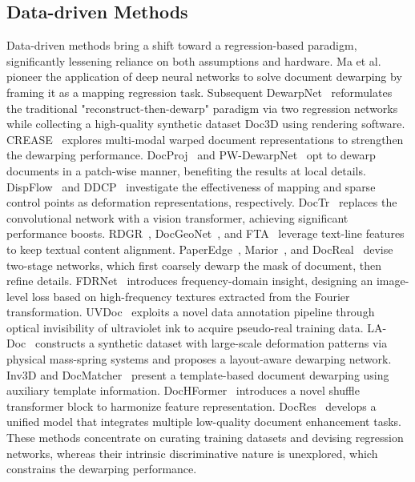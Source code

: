 \subsection{Data-driven Methods}
Data-driven methods bring a shift toward a regression-based paradigm, significantly lessening reliance on both assumptions and hardware. Ma et al.~\citeyearpar{ma2018docunet} pioneer the application of deep neural networks to solve document dewarping by framing it as a mapping regression task. Subsequent DewarpNet~\cite{das2019dewarpnet} reformulates the traditional "reconstruct-then-dewarp" paradigm via two regression networks while collecting a high-quality synthetic dataset Doc3D using rendering software. CREASE~\cite{markovitz2020can} explores multi-modal warped document representations to strengthen the dewarping performance.
DocProj~\cite{li2019document} and PW-DewarpNet~\cite{das2021end} opt to dewarp documents in a patch-wise manner, benefiting the results at local details. DispFlow~\cite{xie2020dewarping} and DDCP~\cite{xie2021document} investigate the effectiveness of mapping and sparse control points as deformation representations, respectively. DocTr~\cite{feng2021doctr} replaces the convolutional network with a vision transformer, achieving significant performance boosts. 
RDGR~\cite{jiang2022RDGR}, DocGeoNet~\cite{Feng2022geodocnet}, and FTA~\cite{li2023foreground} leverage text-line features to keep textual content alignment. PaperEdge~\cite{RN58}, Marior~\cite{jiaxin2022marior}, and DocReal~\cite{yu_docreal_2024} devise two-stage networks, which first coarsely dewarp the mask of document, then refine details. 
FDRNet~\cite{xue2022fourier} introduces frequency-domain insight, designing an image-level loss based on high-frequency textures extracted from the Fourier transformation. UVDoc~\cite{verhoeven2023neural} exploits a novel data annotation pipeline through optical invisibility of ultraviolet ink to acquire pseudo-real training data. LA-Doc~\cite{li2023ladoc} constructs a synthetic dataset with large-scale deformation patterns via physical mass-spring systems and proposes a layout-aware dewarping network. Inv3D and DocMatcher~\cite{hertlein2025docmatcher,hertlein2023inv3d} present a template-based document dewarping using auxiliary template information. DocHFormer~\cite{zhou_dochformer_2025} introduces a novel shuffle transformer block to harmonize feature representation. DocRes~\cite{zhang_2024_docres} develops a unified model that integrates multiple low-quality document enhancement tasks. These methods concentrate on curating training datasets and devising regression networks, whereas their intrinsic discriminative nature is unexplored, which constrains the dewarping performance.

